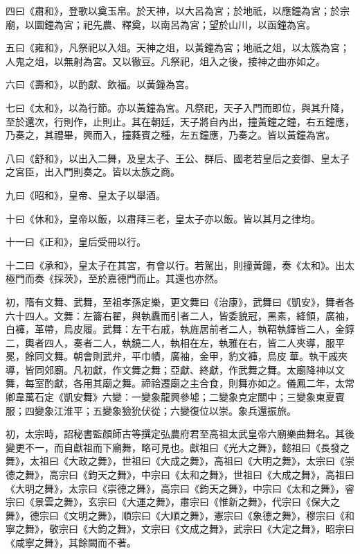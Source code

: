 \begin{pinyinscope}
 四曰《肅和》，登歌以奠玉帛。於天神，以大呂為宮；於地祇，以應鐘為宮；於宗廟，以圜鐘為宮；祀先農、釋奠，以南呂為宮；望於山川，以函鐘為宮。



 五曰《雍和》，凡祭祀以入俎。天神之俎，以黃鐘為宮；地祇之俎，以太簇為宮；人鬼之俎，以無射為宮。又以徹豆。凡祭祀，俎入之後，接神之曲亦如之。



 六曰《壽和》，以酌獻、飲福。以黃鐘為宮。



 七曰《太和》，以為行節。亦以黃鐘為宮。凡祭祀，天子入門而即位，與其升降，至於還次，行則作，止則止。其在朝廷，天子將自內出，撞黃鐘之鐘，右五鐘應，乃奏之，其禮畢，興而入，撞蕤賓之種，左五鐘應，乃奏之。皆以黃鐘為宮。



 八曰《舒和》，以出入二舞，及皇太子、王公、群后、國老若皇后之妾御、皇太子之宮臣，出入門則奏之。皆以太族之商。



 九曰《昭和》，皇帝、皇太子以舉酒。



 十曰《休和》，皇帝以飯，以肅拜三老，皇太子亦以飯。皆以其月之律均。



 十一曰《正和》，皇后受冊以行。



 十二曰《承和》，皇太子在其宮，有會以行。若駕出，則撞黃鐘，奏《太和》。出太極門而奏《採茨》，至於嘉德門而止。其還也亦然。



 初，隋有文舞、武舞，至祖孝孫定樂，更文舞曰《治康》，武舞曰《凱安》，舞者各六十四人。文舞：左籥右翟，與執纛而引者二人，皆委貌冠，黑素，絳領，廣袖，白褲，革帶，烏皮履。武舞：左干右戚，執旌居前者二人，執鞀執鐸皆二人，金錞二，輿者四人，奏者二人，執鐃二人，執相在左，執雅在右，皆二人夾導，服平冕，餘同文舞。朝會則武弁，平巾幘，廣袖，金甲，豹文褲，烏皮華。執干戚夾導，皆同郊廟。凡初獻，作文舞之舞；亞獻、終獻，作武舞之舞。太廟降神以文舞，每室酌獻，各用其廟之舞。禘祫遷廟之主合食，則舞亦如之。儀鳳二年，太常卿韋萬石定《凱安舞》六變：一變象龍興參墟；二變象克定關中；三變象東夏賓服；四變象江淮平；五變象獫狁伏從；六變復位以崇。象兵還振旅。



 初，太宗時，詔秘書監顏師古等撰定弘農府君至高祖太武皇帝六廟樂曲舞名。其後變更不一，而自獻祖而下廟舞，略可見也。獻祖曰《光大之舞》，懿祖曰《長發之舞》，太祖曰《大政之舞》，世祖曰《大成之舞》，高祖曰《大明之舞》，太宗曰《崇德之舞》，高宗曰《鈞天之舞》，中宗曰《太和之舞》，世祖曰《大成之舞》，高祖曰《大明之舞》，太宗曰《崇德之舞》，高宗曰《鈞天之舞》，中宗曰《太和之舞》，睿宗曰《景雲之舞》，玄宗曰《大運之舞》，肅宗曰《惟新之舞》，代宗曰《保大之舞》，德宗曰《文明之舞》，順宗曰《大順之舞》，憲宗曰《象德之舞》，穆宗曰《和寧之舞》，敬宗曰《大鈞之舞》，文宗曰《文成之舞》，武宗曰《大定之舞》，昭宗曰《咸寧之舞》，其餘闕而不著。




\end{pinyinscope}
